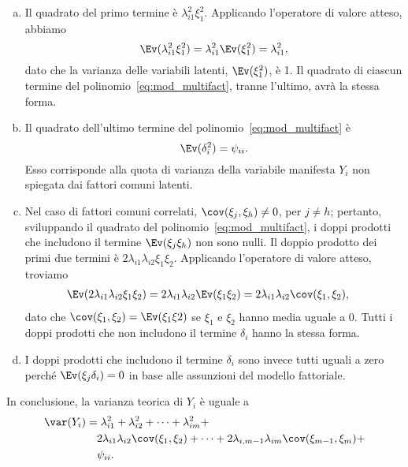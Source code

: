 \begin{enumerate}[(a)]
\item 
  Il quadrato del primo termine è $\lambda_{i1}^2 \xi_1^2$.
Applicando l'operatore di valore atteso, abbiamo
\begin{equation}
\Ev(\lambda_{i1}^2 \xi_1^2) = \lambda_{i1}^2 \Ev(\xi_1^2)= \lambda_{i1}^2,\notag
\end{equation}
dato che la varianza delle variabili latenti, $\Ev(\xi_1^2)$, è 1.
Il quadrato di ciascun termine del polinomio~\ref{eq:mod_multifact}, tranne l'ultimo, avrà la stessa forma.
\item 
  Il quadrato dell'ultimo termine del polinomio~\ref{eq:mod_multifact} è 
\begin{equation}
  \Ev(\delta_{i}^2) = \psi_{ii}.\notag
\end{equation} 
Esso corrisponde alla quota di varianza della variabile manifesta $Y_i$ non spiegata dai fattori comuni latenti.
\item 
  Nel caso di fattori comuni correlati, $\cov(\xi_j, \xi_h) \neq 0$, per $j\neq h$; pertanto, sviluppando il quadrato del polinomio~\ref{eq:mod_multifact}, i doppi prodotti che includono il termine $\Ev(\xi_j \xi_h)$ non sono nulli. 
Il doppio prodotto dei primi due termini è $2\lambda_{i1} \lambda_{i2} \xi_1 \xi_2$.
Applicando l'operatore di valore atteso, troviamo
\begin{align}
\Ev(2\lambda_{i1} \lambda_{i2} \xi_1 \xi_2) &= 2\lambda_{i1} \lambda_{i2} \Ev(\xi_1\xi_2) 
= 2\lambda_{i1} \lambda_{i2} \cov(\xi_1, \xi_2),\notag
\end{align}
dato che $\cov(\xi_1, \xi_2) = \Ev(\xi_1\xi2)$ se $\xi_1$ e $\xi_2$ hanno media uguale a 0.
Tutti i doppi prodotti che non includono il termine $\delta_i$ hanno la stessa forma.
\item 
  I doppi prodotti che includono il termine $\delta_i$ sono invece tutti uguali a zero perché $\Ev(\xi_j\delta_i) = 0$ in base alle assunzioni del modello fattoriale.
\end{enumerate}

In conclusione, la varianza teorica di $Y_i$ è uguale a
\begin{equation}
\begin{split}
\var(Y_i) &= \lambda_{i1}^2 + \lambda_{i2}^2 + \dots + \lambda_{im}^2  + \\
&\quad 2 \lambda_{i1} \lambda_{i2} \cov(\xi_1, \xi_2) + \dots + 2 \lambda_{i,m-1} \lambda_{im} \cov(\xi_{m-1}, \xi_m) + \\
&\quad \psi_{ii}.\notag
\end{split}
\end{equation}


